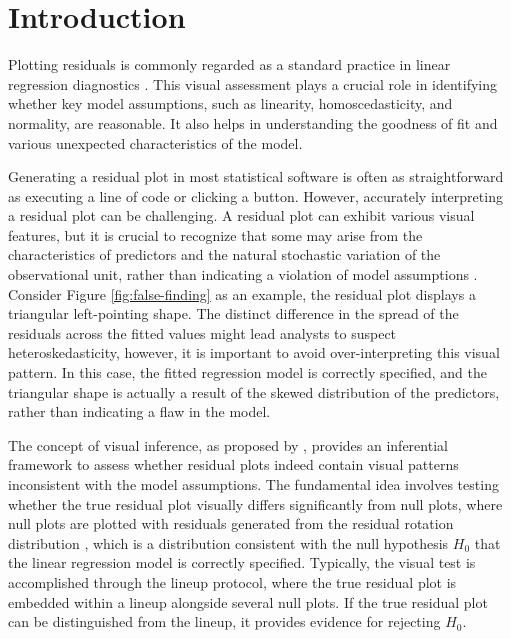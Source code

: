 \documentclass[]{interact}
\theoremstyle{plain}%
\theoremstyle{definition}
\theoremstyle{remark}
\begin{document}
\section{Introduction}\label{sec-model-introduction}

Plotting residuals is commonly regarded as a standard practice in linear
regression diagnostics \citep{belsley1980regression, cook1982residuals}.
This visual assessment plays a crucial role in identifying whether key
model assumptions, such as linearity, homoscedasticity, and normality,
are reasonable. It also helps in understanding the goodness of fit and
various unexpected characteristics of the model.

Generating a residual plot in most statistical software is often as
straightforward as executing a line of code or clicking a button.
However, accurately interpreting a residual plot can be challenging. A
residual plot can exhibit various visual features, but it is crucial to
recognize that some may arise from the characteristics of predictors and
the natural stochastic variation of the observational unit, rather than
indicating a violation of model assumptions \citep{li2024plot}. Consider
Figure \ref{fig:false-finding} as an example, the residual plot displays
a triangular left-pointing shape. The distinct difference in the spread
of the residuals across the fitted values might lead analysts to suspect
heteroskedasticity, however, it is important to avoid over-interpreting
this visual pattern. In this case, the fitted regression model is
correctly specified, and the triangular shape is actually a result of
the skewed distribution of the predictors, rather than indicating a flaw
in the model.

The concept of visual inference, as proposed by
\citet{buja2009statistical}, provides an inferential framework to assess
whether residual plots indeed contain visual patterns inconsistent with
the model assumptions. The fundamental idea involves testing whether the
true residual plot visually differs significantly from null plots, where
null plots are plotted with residuals generated from the residual
rotation distribution \citep{langsrud2005rotation}, which is a
distribution consistent with the null hypothesis \(H_0\) that the linear
regression model is correctly specified. Typically, the visual test is
accomplished through the lineup protocol, where the true residual plot
is embedded within a lineup alongside several null plots. If the true
residual plot can be distinguished from the lineup, it provides evidence
for rejecting \(H_0\).
\end{document}
